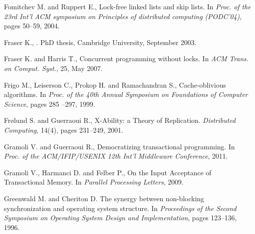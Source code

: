 \begin{thebibliography}{99}
{
Fomitchev M. and Ruppert E.,
\newblock Lock-free linked lists and skip lists.
\newblock In {\em Proc. of the 23rd Int'l ACM symposium on
  Principles of distributed computing (PODC'04)}, pages 50--59, 2004.


Fraser K.,
.
\newblock PhD thesis, Cambridge University, September 2003.




Fraser K. and Harris T.,
\newblock Concurrent programming without locks.
\newblock In {\em ACM Trans. on Comput. Syst.}, 25, May 2007.


Frigo M., Leiserson C., Prokop H. and Ramachandran S.,
\newblock Cache-oblivious algorithms.
\newblock In {\em Proc. of the 40th Annual Symposium on Foundations of
  Computer Science}, pages 285 --297, 1999.






Fr{\o}lund S. and Guerraoui R.,
X-Ability: a Theory of Replication.
{\it Distributed Computing}, 14(4), pages 231--249, 2001. 




Gramoli V. and Guerraoui R.,
\newblock Democratizing transactional programming.
\newblock In {\em Proc. of the ACM/IFIP/USENIX 12th Int'l Middleware
  Conference}, 2011.

Gramoli V., Harmanci D. and Felber P.,
\newblock On the {I}nput {A}cceptance of {T}ransactional {M}emory.
\newblock In {\em Parallel {P}rocessing {L}etters}, 2009.




Greenwald M. and Cheriton D.
\newblock The synergy between non-blocking synchronization and operating system structure.
\newblock In {\em Proceedings of the Second Symposium on Operating System
Design and Implementation}, pages 123--136, 1996.





}
\end{thebibliography}
